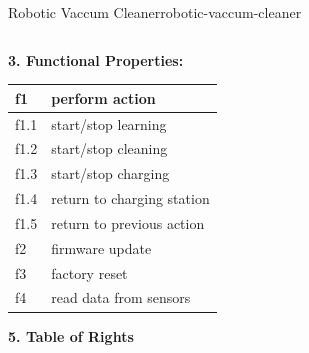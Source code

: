 \documentclass[12pt]{article}
\begin{document}
\begin{example}{Robotic Vaccum Cleaner}{robotic-vaccum-cleaner}
\begin{table}[H]
\begin{tabular}{|c|c|c|}
      \hline
    \end{tabular}
  \end{table}
  \textbf{3. Functional Properties:}
  \begin{table}[H]
    \centering
    \begin{tabular}{|l|l|}
      \hline
      f1 & perform action \\
      \hline
      f1.1 & start/stop learning \\
      \hline
      f1.2 & start/stop cleaning \\
      \hline
      f1.3 & start/stop charging \\
      \hline
      f1.4 & return to charging station \\
      \hline
      f1.5 & return to previous action \\
      \hline
      f2 & firmware update \\
      \hline
      f3 & factory reset \\
      \hline
      f4 & read data from sensors \\
      \hline
    \end{tabular}
  \end{table}
  \textbf{5. Table of Rights}
\end{example}
\end{document}
